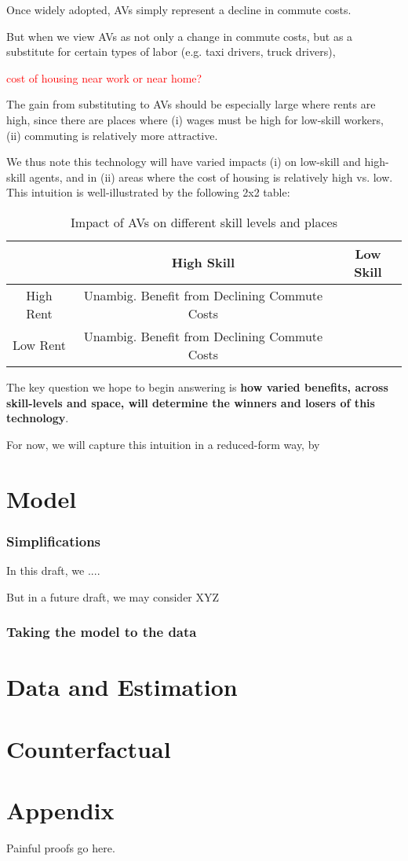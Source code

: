 \documentclass{article}
\begin{document}
Once widely adopted, AVs simply represent a decline in commute costs.

But when we view AVs as not only a change in commute costs, but as a substitute for certain types of labor (e.g. taxi drivers, truck drivers),
 
\textcolor{red}{cost of housing near work or near home?}

The gain from substituting to AVs should be especially large where rents are high, since there are places where (i) wages must be high for low-skill workers, (ii) commuting  is relatively more attractive. 


We thus note this technology will have varied impacts (i) on low-skill and high-skill agents, and in (ii) areas where the cost of housing is relatively high vs. low.
This intuition is well-illustrated by the following 2x2 table:
\begin{table}[h!]
\centering
\begin{tabular}{|c|c|c|}
\hline
 & High Skill & Low Skill \\ \hline
High Rent & Unambig. Benefit from Declining Commute Costs &  \\ \hline
Low Rent & Unambig. Benefit from Declining Commute Costs &  \\ \hline
\end{tabular}
\caption{Impact of AVs on different skill levels and places}
\label{tab:impact_avs}
\end{table}


The key question we hope to begin answering is \textbf{how varied benefits, across skill-levels and space, will determine the winners and losers of this technology}.

For now, we will capture this intuition in a reduced-form way, by 

\section{Model}


\subsubsection{Simplifications}

In this draft, we ....

But in a future draft, we may consider XYZ


\subsubsection{Taking the model to the data}


\section{Data and Estimation}





\section{Counterfactual}

\section{Appendix}
Painful proofs go here.


\end{document}
